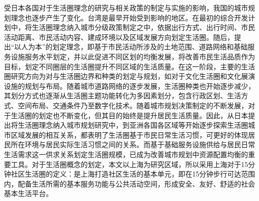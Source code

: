 \documentclass{shnuthesis}
\begin{document}
\indent 受日本各国对于生活圈理念的研究与相关政策的制定与实施的影响，我国的城市规划理念也逐步产生了变化。台湾是最早开始受到影响的地区。在最初的综合开发计划中，将生活圈理念纳入城市分级政策制定之中，依据出行方式、出行时间、市民活动距离、市民活动内容、建成环境以及区域发展方向划定生活圈。随后，提出“以人为本”的划定理念，即基于市民活动所涉及的土地范围、道路网络和基础服务设施服务水平划定，并以此促进不同区划的均衡发展，将改善市民生活品质作为目标，划定不同圈层的生活圈提升不同区域的生活质量\textsuperscript{\cite{chen1991}}。在这一阶段，主要的生活圈研究方向为对与生活圈边界和种类的划定与规划，如对于文化生活圈和文化展演设施的规划与布局。随着城市道路网络的逐步发展，生活圈种类也开始逐步减少，其划分方式也逐渐从生活圈主题功能转化为多因素划分，包含行政区划、生活方式、空间布局、交通条件乃至数字化技术。随着城市规划决策制定的不断发展，对于生活圈的划定也不断变化，但其目的始终是提升居民生活质量。因此，从日本提出将生活圈理念纳入城市规划研究中，到亚洲各国各区域等开始逐步探索生活圈城市区域发展的相互关系，都表明了生活圈基于市民日常生活习惯，可更好的体现居民所在环境与居民实际生活习惯之间的关系。而基于基础服务设施供给与居民日常生活需求这一供求关系划定生活圈规模，已成为改善城市规划中资源配置均衡的重要工具\textsuperscript{\cite{xiao2014}}。对于生活圈概念的划定，本文以上海为研究区域，所以采用上海对于15分钟社区生活圈的定义：是上海打造社区生活的基本单元，即在15分钟步行可达范围内，配备生活所需的基本服务功能与公共活动空间，形成安全、友好、舒适的社会基本生活平台。\\
\end{document}
